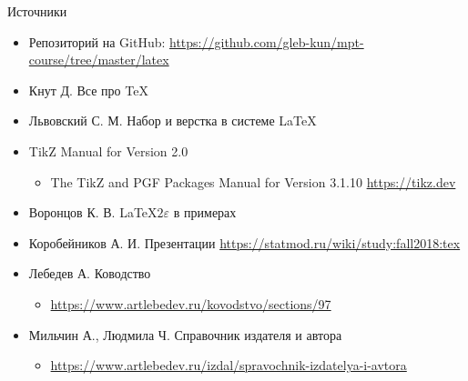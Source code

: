 \documentclass[10pt,aspectratio=169]{beamer}
\begin{document}
 	\begin{frame}[fragile]{Источники}
		\begin{itemize}
			\item Репозиторий на GitHub:
				\url{https://github.com/gleb-kun/mpt-course/tree/master/latex}
    		\item Кнут Д. Все про \TeX
			\item Львовский С. М. Набор и верстка в системе \LaTeX
			\item TikZ Manual for Version 2.0
			\begin{itemize}
				\item The TikZ and PGF Packages Manual for Version 3.1.10 \url{https://tikz.dev}
			\end{itemize}
			\item Воронцов К. В. \LaTeX $2{\varepsilon}$ в примерах
			\item Коробейников А. И. Презентации \url{https://statmod.ru/wiki/study:fall2018:tex}
			\item Лебедев А. Ководство
			\begin{itemize}
			\item \url{https://www.artlebedev.ru/kovodstvo/sections/97}
			\end{itemize}
			\item Мильчин А., Людмила Ч. Справочник издателя и автора
			\begin{itemize}
				\item \url{https://www.artlebedev.ru/izdal/spravochnik-izdatelya-i-avtora}
			\end{itemize}
		\end{itemize}
	\end{frame}

    \backmatter
\end{document}
